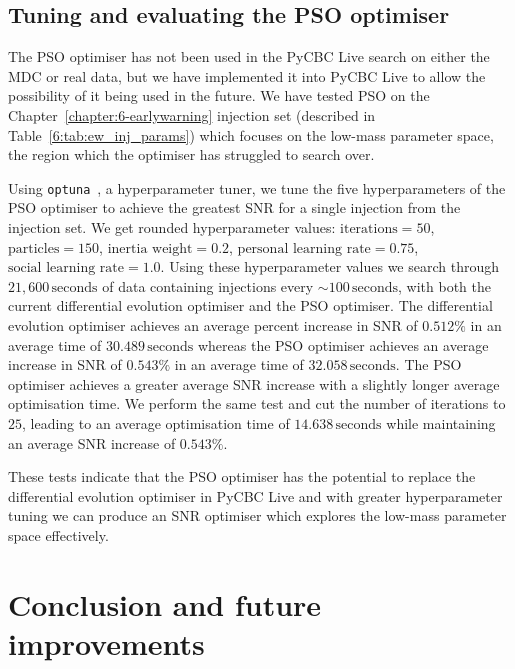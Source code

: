 \subsection{\label{7:sec:tuning-pso}Tuning and evaluating the PSO optimiser}

The PSO optimiser has not been used in the PyCBC Live search on either the MDC or real data, but we have implemented it into PyCBC Live to allow the possibility of it being used in the future. We have tested PSO on the Chapter~\ref{chapter:6-earlywarning} injection set (described in Table~\ref{6:tab:ew_inj_params}) which focuses on the low-mass parameter space, the region which the optimiser has struggled to search over.

Using \texttt{optuna}~\cite{optuna:2019}, a hyperparameter tuner, we tune the five hyperparameters of the PSO optimiser to achieve the greatest SNR for a single \gwadj injection from the injection set. We get rounded hyperparameter values: $\text{iterations} = 50$, $\text{particles} = 150$, $\text{inertia weight} = 0.2$, $\text{personal learning rate} = 0.75$, $\text{social learning rate} = 1.0$. Using these hyperparameter values we search through $21,600 \, \text{seconds}$ of \gwadj data containing \gwadj injections every ${\sim}100 \, \text{seconds}$, with both the current differential evolution optimiser and the PSO optimiser. The differential evolution optimiser achieves an average percent increase in SNR of $0.512 \%$ in an average time of $30.489 \, \text{seconds}$ whereas the PSO optimiser achieves an average increase in SNR of $0.543\%$ in an average time of $32.058 \, \text{seconds}$. The PSO optimiser achieves a greater average SNR increase with a slightly longer average optimisation time. We perform the same test and cut the number of iterations to $25$, leading to an average optimisation time of  $14.638 \, \text{seconds}$ while maintaining an average SNR increase of $0.543\%$.

These tests indicate that the PSO optimiser has the potential to replace the differential evolution optimiser in PyCBC Live and with greater hyperparameter tuning we can produce an SNR optimiser which explores the low-mass parameter space effectively.

\section{\label{7:sec:conclusion}Conclusion and future improvements}

